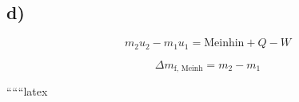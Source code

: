 

\subsection*{d)}
\[
m_2 u_2 - m_1 u_1 = \text{Meinhin} + Q - W
\]

\[
\Delta m_{\text{f, Meinh}} = m_2 - m_1
\]

``````latex